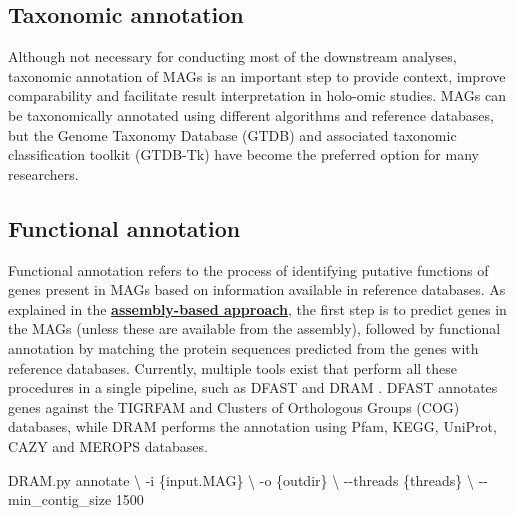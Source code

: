 \documentclass[
]{book}
\newenvironment{Shaded}{\begin{snugshade}}{\end{snugshade}}
\newcommand{\AttributeTok}[1]{\textcolor[rgb]{0.77,0.63,0.00}{#1}}
\newcommand{\DataTypeTok}[1]{\textcolor[rgb]{0.13,0.29,0.53}{#1}}
\newcommand{\ExtensionTok}[1]{#1}
\newcommand{\NormalTok}[1]{#1}
\begin{document}
\hypertarget{genome-resolved-taxonomy}{%
\subsection*{Taxonomic annotation}\label{genome-resolved-taxonomy}}

Although not necessary for conducting most of the downstream analyses, taxonomic annotation of MAGs is an important step to provide context, improve comparability and facilitate result interpretation in holo-omic studies. MAGs can be taxonomically annotated using different algorithms and reference databases, but the Genome Taxonomy Database (GTDB) \citep{Parks2022-zl} and associated taxonomic classification toolkit (GTDB-Tk) \citep{Chaumeil2022-jr} have become the preferred option for many researchers.

\hypertarget{genome-resolved-function}{%
\subsection*{Functional annotation}\label{genome-resolved-function}}

Functional annotation refers to the process of identifying putative functions of genes present in MAGs based on information available in reference databases. As explained in the \textbf{\protect\hyperlink{assembly-based}{assembly-based approach}}, the first step is to predict genes in the MAGs (unless these are available from the assembly), followed by functional annotation by matching the protein sequences predicted from the genes with reference databases. Currently, multiple tools exist that perform all these procedures in a single pipeline, such as DFAST \citep{Tanizawa2017-uy} and DRAM \citep{Shaffer2020-kp}. DFAST annotates genes against the TIGRFAM and Clusters of Orthologous Groups (COG) databases, while DRAM performs the annotation using Pfam, KEGG, UniProt, CAZY and MEROPS databases.

\begin{Shaded}
\begin{Highlighting}[]
\ExtensionTok{DRAM.py}\NormalTok{ annotate }\DataTypeTok{\textbackslash{}}
      \AttributeTok{{-}i}\NormalTok{ \{input.MAG\} }\DataTypeTok{\textbackslash{}}
      \AttributeTok{{-}o}\NormalTok{ \{outdir\} }\DataTypeTok{\textbackslash{}}
      \AttributeTok{{-}{-}threads}\NormalTok{ \{threads\} }\DataTypeTok{\textbackslash{}}
      \AttributeTok{{-}{-}min\_contig\_size}\NormalTok{ 1500}
\end{Highlighting}
\end{Shaded}
\end{document}
